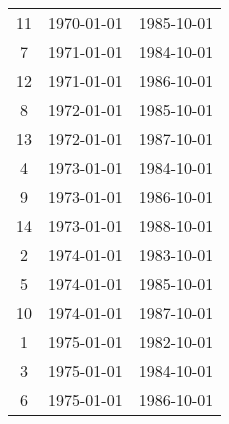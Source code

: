 % 
\begin{tabular}{ccc}
  \hline
  \hline
11 & 1970-01-01 & 1985-10-01 \\ 
  7 & 1971-01-01 & 1984-10-01 \\ 
  12 & 1971-01-01 & 1986-10-01 \\ 
  8 & 1972-01-01 & 1985-10-01 \\ 
  13 & 1972-01-01 & 1987-10-01 \\ 
  4 & 1973-01-01 & 1984-10-01 \\ 
  9 & 1973-01-01 & 1986-10-01 \\ 
  14 & 1973-01-01 & 1988-10-01 \\ 
  2 & 1974-01-01 & 1983-10-01 \\ 
  5 & 1974-01-01 & 1985-10-01 \\ 
  10 & 1974-01-01 & 1987-10-01 \\ 
  1 & 1975-01-01 & 1982-10-01 \\ 
  3 & 1975-01-01 & 1984-10-01 \\ 
  6 & 1975-01-01 & 1986-10-01 \\ 
   \hline
\end{tabular}
